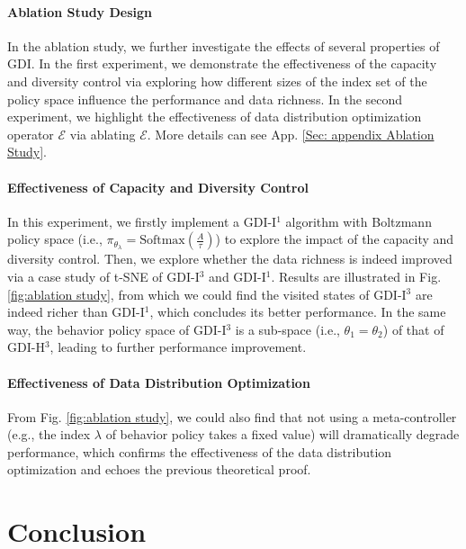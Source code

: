 \paragraph{Ablation Study Design} In the ablation study, we further investigate the effects of several properties of GDI. In the first experiment, we demonstrate the effectiveness of the capacity and diversity control via exploring how different sizes  of the index set of the policy space influence the performance and data richness. In the second experiment, we highlight the effectiveness of data distribution optimization operator $\mathcal{E}$ via ablating $\mathcal{E}$. More details can see App. \ref{Sec: appendix Ablation Study}.
 

\paragraph{Effectiveness of Capacity and Diversity Control}

In this experiment, we firstly implement a GDI-I$^1$ algorithm with Boltzmann policy space (i.e., $\pi_{\theta_{\lambda}}=\text{Softmax}(\frac{A}{\tau})$) to explore the impact of the  capacity and diversity control. Then, we explore whether the data richness is indeed improved via a case study of t-SNE of GDI-I$^3$ and GDI-I$^1$. Results are illustrated in Fig. \ref{fig:ablation study}, from which we could find the visited states of GDI-I$^3$ are indeed  richer than GDI-I$^1$, which concludes its better performance. In the same way, the behavior policy space of GDI-I$^3$ is a sub-space (i.e., $\theta_1=\theta_2$) of that of GDI-H$^3$, leading to further performance improvement.

\paragraph{Effectiveness of  Data Distribution Optimization} 
From  Fig. \ref{fig:ablation study}, we could also find that not using a meta-controller (e.g., the index $\lambda$ of behavior policy takes a fixed value) will  dramatically degrade performance, which confirms the effectiveness of the data distribution optimization and echoes the previous theoretical proof.

\section{Conclusion}


